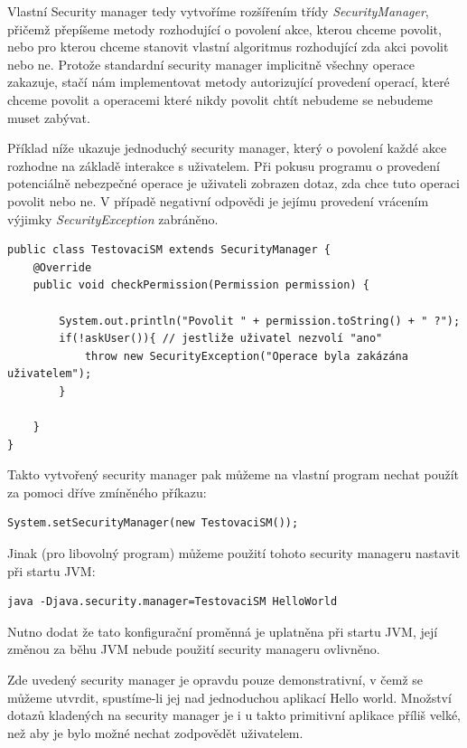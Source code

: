 Vlastní Security manager tedy vytvoříme rozšířením třídy {\it SecurityManager}, přičemž přepíšeme metody rozhodující o povolení akce, kterou chceme povolit, nebo pro kterou chceme stanovit vlastní algoritmus rozhodující zda akci povolit nebo ne.
Protože standardní security manager implicitně všechny operace zakazuje, stačí nám implementovat metody autorizující provedení operací, které chceme povolit a operacemi které nikdy povolit chtít nebudeme se nebudeme muset zabývat.

Příklad níže ukazuje jednoduchý security manager, který o povolení každé akce rozhodne na základě interakce s uživatelem. Při pokusu programu o provedení potenciálně nebezpečné operace je uživateli zobrazen dotaz, zda chce tuto operaci povolit nebo ne. V případě negativní odpovědi je jejímu provedení vrácením výjimky {\it SecurityException} zabráněno.

\begin{verbatim}
public class TestovaciSM extends SecurityManager {
    @Override
    public void checkPermission(Permission permission) {
        
        System.out.println("Povolit " + permission.toString() + " ?");
        if(!askUser()){ // jestliže uživatel nezvolí "ano"
            throw new SecurityException("Operace byla zakázána uživatelem");
        }
        
    }
}
\end{verbatim}

Takto vytvořený security manager pak můžeme na vlastní program nechat použít za pomoci dříve zmíněného příkazu:

\begin{verbatim}
System.setSecurityManager(new TestovaciSM());
\end{verbatim}

Jinak (pro libovolný program) můžeme použití tohoto security manageru nastavit při startu JVM:

\begin{verbatim}
java -Djava.security.manager=TestovaciSM HelloWorld
\end{verbatim}

Nutno dodat že tato konfigurační proměnná je uplatněna při startu JVM, její změnou za běhu JVM nebude použití security manageru ovlivněno.

Zde uvedený security manager je opravdu pouze demonstrativní, v čemž se můžeme utvrdit, spustíme-li jej nad jednoduchou aplikací Hello world. Množství dotazů kladených na security manager je i u takto primitivní aplikace příliš velké, než aby je bylo možné nechat zodpovědět uživatelem.

